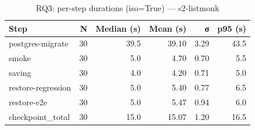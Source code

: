 \begin{table}[htbp]
\centering
\small
\caption{RQ3: per-step durations (iso=True) — s2-listmonk}
\label{tab:rq3-s2-listmonk-steps}
\begin{tabular}{lrrrrr}
\toprule
\textbf{Step} & \textbf{N} & \textbf{Median (s)} & \textbf{Mean (s)} & \textbf{σ} & \textbf{p95 (s)} \\
\midrule
postgres-migrate & 30 & 39.5 & 39.10 & 3.29 & 43.5 \\
smoke & 30 & 5.0 & 4.70 & 0.70 & 5.5 \\
saving & 30 & 4.0 & 4.20 & 0.71 & 5.0 \\
restore-regression & 30 & 5.0 & 5.40 & 0.77 & 6.5 \\
restore-e2e & 30 & 5.0 & 5.47 & 0.94 & 6.0 \\
checkpoint_total & 30 & 15.0 & 15.07 & 1.20 & 16.5 \\
\bottomrule
\end{tabular}
\end{table}